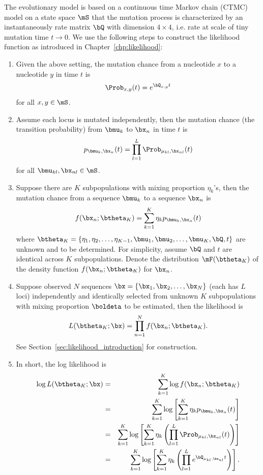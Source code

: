 The evolutionary model is based on a continuous time Markov chain
(CTMC) model
on a state space $\mS$
that the mutation process is characterized by
an instantaneously rate matrix $\bQ$ with dimension $4\times 4$,
i.e. rate at scale of tiny mutation time $t\rightarrow 0$.
We use the following steps to construct the likelihood function
as introduced in Chapter~\ref{chp:likelihood}:
\begin{enumerate}
\item
Given the above setting,
the mutation chance from a nucleotide $x$ to a nucleotide $y$ in time $t$ is
\begin{equation}
\Prob_{x, y}(t) = e^{\bQ_{x, y}t}
\label{eqn:e_Qt}
\end{equation}
for all $x, y \in \mS$.

\item
Assume each locus is mutated independently, then the mutation chance
(the transition probability) from $\bmu_k$ to $\bx_n$ in time $t$ is
$$
p_{\bmu_k, \bx_n}(t) = \prod_{l = 1}^L \Prob_{\mu_{kl}, \bx_{nl}}(t)
$$
for all $\bmu_{kl}, \bx_{nl} \in \mS$.

\item
Suppose there are $K$ subpopulations with mixing proportion $\eta_k$'s, then
the mutation chance from a sequence $\bmu_k$ to a sequence $\bx_n$ is
\begin{equation}
f(\bx_n; \btheta_K) = \sum_{k = 1}^K \eta_k p_{\bmu_k, \bx_n}(t)
\label{eqn:phyclust_mixture}
\end{equation}
where $\btheta_K = \{\eta_1, \eta_2, \ldots, \eta_{K-1},
                     \bmu_1, \bmu_2, \ldots, \bmu_{K}, \bQ, t\}$
are unknown and to be determined.
For simplicity, assume $\bQ$ and $t$ are identical across $K$ subpopulations.
Denote the distribution $\mF(\btheta_K)$ of the density function
$f(\bx_n; \btheta_K)$ for $\bx_n$.

\item
Suppose observed $N$ sequences $\bx = \{\bx_1, \bx_2, \ldots, \bx_N\}$
(each has $L$ loci)
independently and identically selected from unknown $K$ subpopulations
with mixing proportion $\boldeta$ to be estimated,
then the likelihood is
$$
L(\btheta_K; \bx) = \prod_{n = 1}^N f(\bx_n; \btheta_K).
$$
See Section~\ref{sec:likelihood_introduction} for construction.

\item
In short, the log likelihood is
\begin{eqnarray}
\log L(\btheta_K; \bx)
  & = & \sum_{k = 1}^K \log f(\bx_n; \btheta_K) \nonumber \\
  & = & \sum_{k = 1}^K \log
        \left[
        \sum_{k = 1}^K \eta_k p_{\bmu_k, \bx_n}(t)
        \right] \nonumber \\
  & = & \sum_{k = 1}^K \log
        \left[
        \sum_{k = 1}^K \eta_k
        \left(
        \prod_{l = 1}^L \Prob_{\mu_{kl}, \bx_{nl}}(t)
        \right)
        \right] \nonumber \\
  & = & \sum_{k = 1}^K \log
        \left[
        \sum_{k = 1}^K \eta_k
        \left(
        \prod_{l = 1}^L e^{\bQ_{\mu_{kl}, \bx_{nl}}t}
        \right)
        \right].
\label{eqn:phyclust_mixture_logl}
\end{eqnarray}


\end{enumerate}
